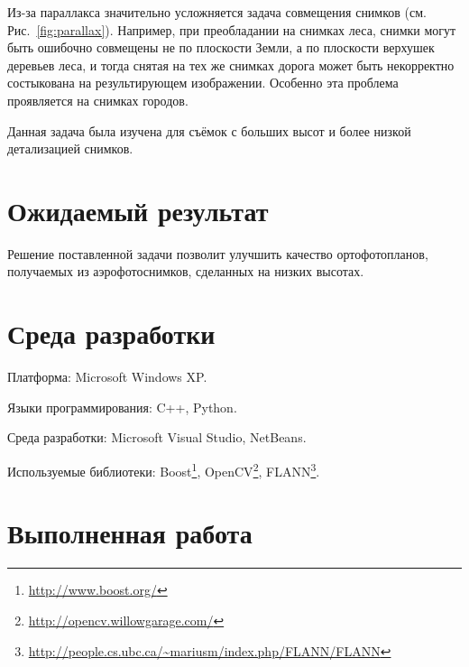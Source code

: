 \documentclass[a4paper,12pt]{article}
\begin{document}
Из-за параллакса значительно усложняется задача совмещения снимков (см. Рис.~\ref{fig:parallax}). 
Например, при преобладании на снимках леса,
снимки могут быть ошибочно совмещены не по плоскости Земли, 
а по плоскости верхушек деревьев леса, и
тогда снятая на тех же снимках дорога может быть некорректно состыкована на
результирующем изображении.
Особенно эта проблема проявляется на снимках городов.

Данная задача была изучена для съёмок с больших высот и более низкой 
детализацией снимков.

\section{Ожидаемый результат}
Решение поставленной задачи позволит улучшить качество ортофотопланов, 
получаемых из аэрофотоснимков, сделанных на низких высотах. 

\section{Среда разработки}

Платформа: Microsoft Windows XP.

Языки программирования: C++, Python.

Среда разработки: Microsoft Visual Studio, NetBeans.

Используемые библиотеки: Boost\footnote{\url{http://www.boost.org/}}, 
OpenCV\footnote{\url{http://opencv.willowgarage.com/}}, 
FLANN\footnote{\url{http://people.cs.ubc.ca/~mariusm/index.php/FLANN/FLANN}}. %

\section{Выполненная работа}

% 
% 
%    
% 
% 
% 
\end{document}
